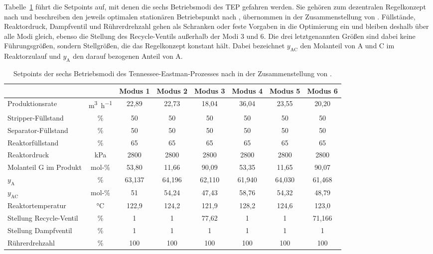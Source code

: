 %
Tabelle~\ref{tab:modes_setpoints} führt die Setpoints auf, mit denen die sechs Betriebsmodi des \ac{TEP} gefahren werden. Sie gehören zum dezentralen Regelkonzept nach \cite{ricker.1996} und beschreiben den jeweils optimalen stationären Betriebspunkt nach \cite{ricker.1995}, übernommen in der Zusammenstellung von \cite{reinartz.2021}. Füllstände, Reaktordruck, Dampfventil und Rührerdrehzahl gehen als Schranken oder feste Vorgaben in die Optimierung ein und bleiben deshalb über alle Modi gleich, ebenso die Stellung des Recycle-Ventils außerhalb der Modi 3 und 6. Die drei letztgenannten Größen sind dabei keine Führungsgrößen, sondern Stellgrößen, die das Regelkonzept konstant hält. Dabei bezeichnet $y_\mathrm{AC}$ den Molanteil von A und C im Reaktorzulauf und $y_\mathrm{A}$ den darauf bezogenen Anteil von A.
%
\begin{table}[htbp]
\centering
\footnotesize
\caption{Setpoints der sechs Betriebsmodi des Tennessee-Eastman-Prozesses nach \cite{ricker.1995, ricker.1996} in der Zusammenstellung von \cite{reinartz.2021}.}
\label{tab:modes_setpoints}
\renewcommand{\arraystretch}{1.2}
\begin{tabular}{l c c c c c c c}
\toprule
& & \textbf{Modus 1} & \textbf{Modus 2} & \textbf{Modus 3} & \textbf{Modus 4} & \textbf{Modus 5} & \textbf{Modus 6} \\
\midrule
Produktionsrate         & \si{\metre\cubed\per\hour} & 22,89  & 22,73  & 18,04  & 36,04  & 23,55  & 20,20  \\
Stripper-Füllstand      & \si{\percent}              & 50     & 50     & 50     & 50     & 50     & 50     \\
Separator-Füllstand     & \si{\percent}              & 50     & 50     & 50     & 50     & 50     & 50     \\
Reaktorfüllstand        & \si{\percent}              & 65     & 65     & 65     & 65     & 65     & 65     \\
Reaktordruck            & \si{\kilo\pascal}          & 2800   & 2800   & 2800   & 2800   & 2800   & 2800   \\
Molanteil G im Produkt  & mol-\%                     & 53,80  & 11,66  & 90,09  & 53,35  & 11,65  & 90,07  \\
$y_\mathrm{A}$          & \si{\percent}              & 63,137 & 64,196 & 62,110 & 61,940 & 64,030 & 61,468 \\
$y_\mathrm{AC}$         & mol-\%                     & 51     & 54,24  & 47,43  & 58,76  & 54,32  & 48,79  \\
Reaktortemperatur       & \si{\celsius}              & 122,9  & 124,2  & 121,9  & 128,2  & 124,6  & 123,0  \\
Stellung Recycle-Ventil & \si{\percent}              & 1      & 1      & 77,62  & 1      & 1      & 71,166 \\
Stellung Dampfventil    & \si{\percent}              & 1      & 1      & 1      & 1      & 1      & 1      \\
Rührerdrehzahl          & \si{\percent}              & 100    & 100    & 100    & 100    & 100    & 100    \\
\bottomrule
\end{tabular}
\end{table}
\clearpage
%
